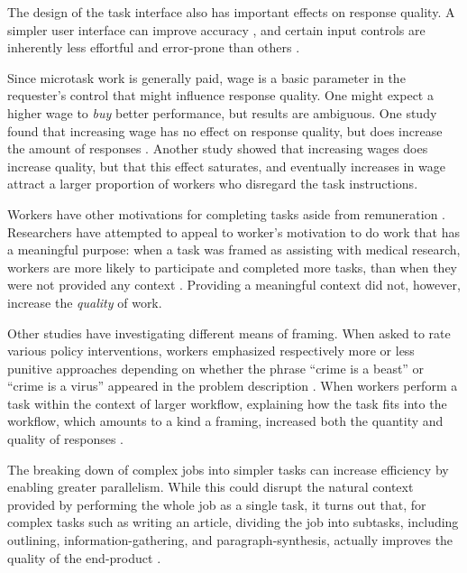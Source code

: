 \documentclass{sigchi}
\begin{document}
The design of the task interface also has important effects on response
quality.  A simpler user interface can improve accuracy 
\cite{Finnerty2013}, and certain input controls
are inherently less effortful and error-prone than others
\cite{cheng2015measuring}.

Since microtask work is generally paid, wage is a basic parameter in
the requester's control that might influence response quality.
One might expect a higher wage to \textit{buy} better performance,
but results are ambiguous.  One study found that increasing wage
has no effect on response quality, but does increase the amount of 
responses \cite{Mason200977}.
Another study \cite{kazai2013analysis} showed that increasing
wages does increase quality, but that this effect saturates, and 
eventually increases in wage attract a larger proportion of workers who 
disregard the task instructions.

Workers have other motivations for completing tasks aside from 
remuneration \cite{kazai2013analysis}.  
Researchers have attempted to appeal to
worker's motivation to do work that has a meaningful purpose:
when a task was framed as assisting with medical research,
workers are more likely to participate and completed more tasks, than
when they were not provided any context \cite{chandler2013breaking}.
Providing a meaningful context did not, however, increase the 
\textit{quality} of work.

Other studies have investigating different means of framing.  
When asked to rate various policy interventions, 
workers emphasized respectively more or less punitive approaches
depending on whether the phrase ``crime is a beast'' or 
``crime is a virus'' appeared in the problem description
\cite{thibodeau2013natural}.
When workers perform a task within the context of larger workflow, 
explaining how the task fits into the workflow, 
which amounts to a kind a framing, increased both the quantity and 
quality of responses \cite{Kinnaird2012281}.

The breaking down of complex jobs into simpler tasks can increase
efficiency by enabling greater parallelism.
While this could disrupt the natural context provided by performing the
whole job as a single task, it turns out that, 
for complex tasks such as writing an article, 
dividing the job into subtasks, including outlining, 
information-gathering, and paragraph-synthesis, actually improves the
quality of the end-product \cite{kittur2011crowdforge}.
\end{document}

